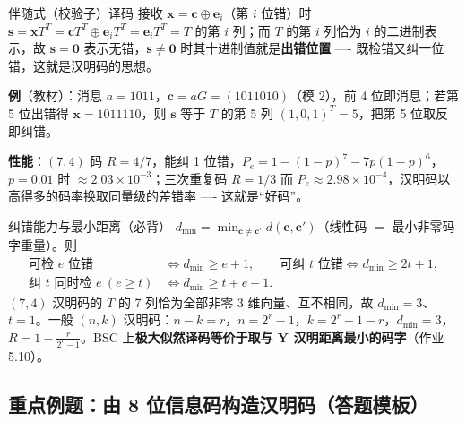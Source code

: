 \begin{defbox}{伴随式（校验子）译码}
接收 $\mathbf{x}=\mathbf{c}\oplus\mathbf{e}_i$（第 $i$ 位错）时
$\mathbf{s}=\mathbf{x}T^{T}=\mathbf{c}T^{T}\oplus\mathbf{e}_iT^{T}=\mathbf{e}_iT^{T}=T$ 的第 $i$ 列；而 $T$ 的第 $i$ 列恰为 $i$ 的二进制表示，故 $\mathbf{s}=\mathbf{0}$ 表示无错，$\mathbf{s}\ne\mathbf{0}$ 时其十进制值就是\textbf{出错位置} ---- 既检错又纠一位错，这就是汉明码的思想。
\end{defbox}

\textbf{例}（教材）：消息 $a=1011$，$\mathbf{c}=aG=(1011010)$（模 2），前 4 位即消息；若第 5 位出错得 $\mathbf{x}=1011110$，则 $\mathbf{s}$ 等于 $T$ 的第 5 列 $(1,0,1)^{T}=5$，把第 5 位取反即纠错。

\textbf{性能}：$(7,4)$ 码 $R=4/7$，能纠 1 位错，$P_e=1-(1-p)^7-7p(1-p)^6$，$p=0.01$ 时 $\approx2.03\times10^{-3}$；三次重复码 $R=1/3$ 而 $P_e\approx2.98\times10^{-4}$，汉明码以高得多的码率换取同量级的差错率 ---- 这就是“好码”。

\begin{keypoint}{纠错能力与最小距离（必背）}
$d_{\min}=\min_{\mathbf{c}\ne\mathbf{c}'}d(\mathbf{c},\mathbf{c}')$（线性码 $=$ 最小非零码字重量）。则
\begin{align*}
\text{可检 }e\text{ 位错}&\iff d_{\min}\ge e+1,\qquad
\text{可纠 }t\text{ 位错}\iff d_{\min}\ge2t+1,\\
\text{纠 }t\text{ 同时检 }e\ (e\ge t)&\iff d_{\min}\ge t+e+1 .
\end{align*}
$(7,4)$ 汉明码的 $T$ 的 7 列恰为全部非零 3 维向量、互不相同，故 $d_{\min}=3$、$t=1$。一般 $(n,k)$ 汉明码：$n-k=r$，$n=2^r-1$，$k=2^r-1-r$，$d_{\min}=3$，$R=1-\frac{r}{2^r-1}$。BSC 上\textbf{极大似然译码等价于取与 $\mathbf{Y}$ 汉明距离最小的码字}（作业 5.10）。
\end{keypoint}

\subsection{重点例题：由 8 位信息码构造汉明码（答题模板）}

